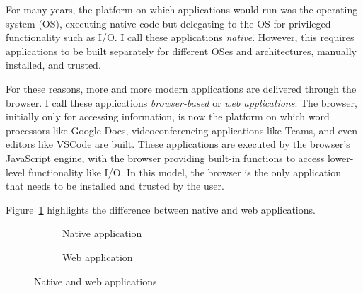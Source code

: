 \label{sec:webdev}

For many years, the platform on which applications would run was the operating system (OS), executing native code but delegating to the OS for privileged functionality such as I/O. I call these applications \emph{native}. However, this requires applications to be built separately for different OSes and architectures, manually installed, and trusted.

For these reasons, more and more modern applications are delivered through the browser. I call these applications \emph{browser-based} or \emph{web applications}. The browser, initially only for accessing information, is now the platform on which word processors like Google Docs, videoconferencing applications like Teams, and even editors like VSCode are built. These applications are executed by the browser's JavaScript engine, with the browser providing built-in functions to access lower-level functionality like I/O. In this model, the browser is the only application that needs to be installed and trusted by the user.

Figure~\ref{fig:web-platform} highlights the difference between native and web applications.

\begin{figure}[H]
\centering
\begin{subfigure}{0.5\textwidth}
  \centering
\caption{Native application}
\end{subfigure}%
\begin{subfigure}{0.5\textwidth}
  \centering
\caption{Web application}
\end{subfigure}
\caption{Native and web applications}
\label{fig:web-platform}
\end{figure}
\vspace*{-2em}

